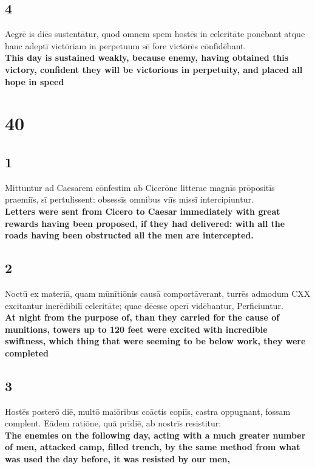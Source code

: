 \documentclass{article}
\begin{document}
\subsection*{4}
Aegrē is diēs sustentātur, quod omnem spem hostēs in celeritāte ponēbant atque hanc adeptī victōriam in perpetuum sē fore victōrēs cōnfīdēbant.\\
\textbf{This day is sustained weakly, because enemy, having obtained this victory, confident they will be victorious in perpetuity, and placed all hope in speed}



\section*{40}

\subsection*{1}
Mittuntur ad Caesarem cōnfestim ab Cicerōne litterae magnīs prōpositīs praemiīs, sī pertulissent: obsessīs omnibus viīs missī intercipiuntur.\\
\textbf{Letters were sent from Cicero to Caesar immediately with great rewards having been proposed, if they had delivered: with all the roads having been obstructed all the men are intercepted.}

\subsection*{2}
Noctū ex materiā, quam mūnītiōnis causā comportāverant, turrēs admodum CXX excitantur incrēdibilī celeritāte; quae dēesse operī vidēbantur, Perficiuntur. \\
\textbf{At night from the purpose of, than they carried for the cause of munitions, towers up to 120 feet were excited with incredible swiftness, which thing that were seeming to be below work, they were completed}

\subsection*{3}
Hostēs posterō diē, multō maiōribus coāctis copiīs, castra oppugnant, fossam complent. Eādem ratiōne, quā prīdiē, ab nostrīs resistitur:\\
\textbf{The enemies on the following day, acting with a much greater number of men, attacked camp, filled trench, by the same method from what was used the day before, it was resisted by our men, }
\end{document}
